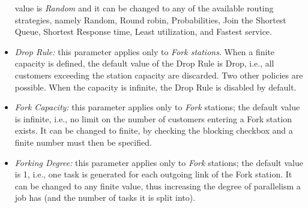\begin{itemize}
value is \emph{Random} and it can be changed to any of the
available routing strategies, namely Random, Round robin,
Probabilities, Join the Shortest Queue, Shortest Response time,
Least utilization, and Fastest service. \item \emph{Drop Rule:}
this parameter applies only to \emph{Fork stations}. When a finite
capacity is defined, the default value of the Drop Rule is Drop,
i.e., all customers exceeding the station capacity are discarded.
Two other policies are possible. When the capacity is infinite,
the Drop Rule is disabled by default. \item \emph{Fork Capacity:}
this parameter applies only to \emph{Fork} stations; the default
value is infinite, i.e., no limit on the number of customers
entering a Fork station exists. It can be changed to finite, by
checking the blocking checkbox and a finite number must then be
specified. \item \emph{Forking Degree:} this parameter applies
only to \emph{Fork} stations; the default value is 1, i.e., one
task is generated for each outgoing link of the Fork station. It
can be changed to any finite value, thus increasing the degree of
parallelism a job has
(and the number of tasks it is split into).\\
\end{itemize}

